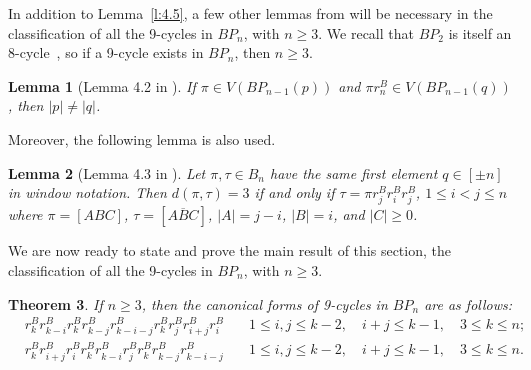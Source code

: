 \documentclass[final]{dmtcs-episciences}
\numberwithin{equation}{section}
\newtheorem{thm}{Theorem}[section]
\newtheorem{lem}[thm]{Lemma}
\begin{document}
In addition to Lemma~\ref{l:4.5}, a few other lemmas from \cite{BBP2018} will be necessary in the classification of all the 9-cycles in $BP_n$, with $n\geq3$. We recall that $BP_2$ is itself an 8-cycle~\cite[Theorem 10]{Compeau2011}, so if a 9-cycle exists in $BP_n$, then $n\geq3$.
\begin{lem}[Lemma 4.2 in \cite{BBP2018}]\label{lem:31}
 If $\pi \in V(BP_{n-1}(p))$ and $\pi r^B_{n} \in V(BP_{n-1}(q))$, then $|p| \neq |q|$.
\end{lem}

Moreover, the following lemma is also used. 
\begin{lem}[Lemma 4.3 in \cite{BBP2018}]\label{lem:32}
Let $\pi,\tau\in B_n$ have the same first element $q\in[\pm n]$ in window notation. Then $d(\pi,\tau) = 3$ if and only if $\tau = \pi 
r^B_{j} r^B_{i} r^B_{j}$, $1 \leq i < j \leq n$ where $\pi = [A B C]$, $\tau=[A \overline{B} C]$, $|A|=j-i$, $|B|=i$, and $|C| \geq 0$.
\end{lem}


We are now ready to state and prove the main result of this section, the classification of all the 9-cycles in $BP_n$, with $n\geq3$.

\begin{thm}\label{t:canonical9cyclesB} If $n\geq3$, then the canonical forms of 9-cycles in $BP_n$ are as follows:  
\begin{align}
    \label{9-1}
    &r^B_{k}r^B_{k-i}r^B_{k}r^B_{k-j}r^B_{k-i-j}r^B_{k}r^B_{j}r^B_{i+j}r^B_{i} &\quad 1 \leq i,j \leq k-2, \quad i+j \leq k-1, \quad 3 \leq k \leq n;\\
    \label{9-2}
    &r^B_{k}r^B_{i+j}r^B_{i}r^B_{k}r^B_{k-i}r^B_{j}r^B_{k}r^B_{k-j}r^B_{k-i-j} &\quad 1 \leq i,j \leq k-2, \quad i+j \leq k-1, \quad 3 \leq k \leq n.
\end{align}
\end{thm}
\end{document}
